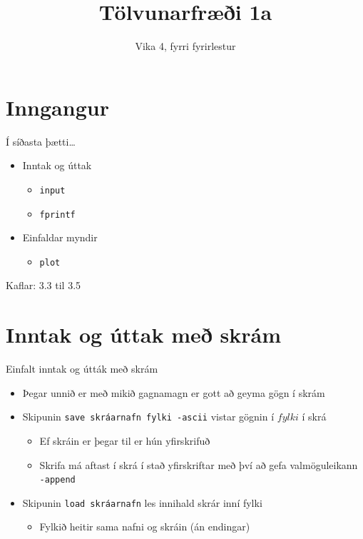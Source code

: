 \documentclass{beamer}
\title{Tölvunarfræði 1a}
\subtitle{Vika 4, fyrri fyrirlestur}
\begin{document}
\begin{frame}
\titlepage
\end{frame}

\section{Inngangur}


\begin{frame}{Í síðasta þætti\ldots}
\begin{itemize}
 \item Inntak og úttak
 \begin{itemize}
  \item \texttt{input}
  \item \texttt{fprintf}
 \end{itemize}
 \item Einfaldar myndir
 \begin{itemize}
  \item \texttt{plot}
 \end{itemize}
\end{itemize}
Kaflar: 3.3 til 3.5
\end{frame}

\section{Inntak og úttak með skrám}

\begin{frame}{Einfalt inntak og útták með skrám}
\begin{itemize}
 \item Þegar unnið er með mikið gagnamagn er gott að geyma gögn í skrám
 \item Skipunin \texttt{save skráarnafn fylki -ascii} vistar gögnin í $fylki$ í skrá
 \begin{itemize}
  \item Ef skráin er þegar til er hún yfirskrifuð
  \item Skrifa má aftast í skrá í stað yfirskriftar með því að gefa valmöguleikann \texttt{-append}
 \end{itemize}
 \item Skipunin \texttt{load skráarnafn} les innihald skrár inní fylki
  \begin{itemize}
   \item Fylkið heitir sama nafni og skráin (án endingar)
  \end{itemize}
 \end{itemize}
\end{frame}
\end{document}

